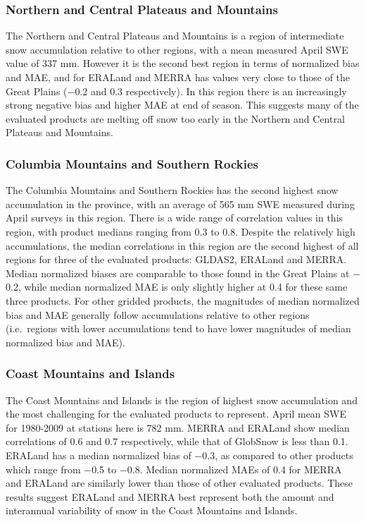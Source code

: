 \documentclass[12pt]{article}
\begin{document}
\subsubsection{Northern and Central Plateaus and Mountains}
The Northern and Central Plateaus and Mountains is a region of intermediate snow accumulation relative to other regions, with a mean measured April SWE value of 337 mm.  However it is the second best region in terms of normalized bias and MAE, and for ERALand and MERRA has values very close to those of the Great Plains ($-$0.2 and 0.3 respectively).  In this region there is an increasingly strong negative bias and higher MAE at end of season.  This suggests many of the evaluated products are melting off snow too early in the Northern and Central Plateaus and Mountains.  

\subsubsection{Columbia Mountains and Southern Rockies}
The Columbia Mountains and Southern Rockies has the second highest snow accumulation in the province, with an average of 565 mm SWE measured during April surveys in this region.  There is a wide range of correlation values in this region, with product medians ranging from 0.3 to 0.8.  Despite the relatively high accumulations, the median correlations in this region are the second highest of all regions for three of the evaluated products:  GLDAS2, ERALand and MERRA.  Median normalized biases are comparable to those found in the Great Plains at $-$0.2, while median normalized MAE is only slightly higher at 0.4 for these same three products.  For other gridded products, the magnitudes of median normalized bias and MAE generally follow accumulations relative to other regions (i.e.\ regions with lower accumulations tend to have lower magnitudes of median normalized bias and MAE).

\subsubsection{Coast Mountains and Islands}
The Coast Mountains and Islands is the region of highest snow accumulation and the most challenging for the evaluated products to represent.  April mean SWE for 1980-2009 at stations here is 782 mm.  MERRA and ERALand show median correlations of 0.6 and 0.7 respectively, while that of GlobSnow is less than 0.1.  ERALand has a median normalized bias of $-$0.3, as compared to other products which range from $-$0.5 to $-$0.8.  Median normalized MAEs of 0.4 for MERRA and ERALand are similarly lower than those of other evaluated products.  These results suggest ERALand and MERRA best represent both the amount and interannual variability of snow in the Coast Mountains and Islands.
\end{document}
